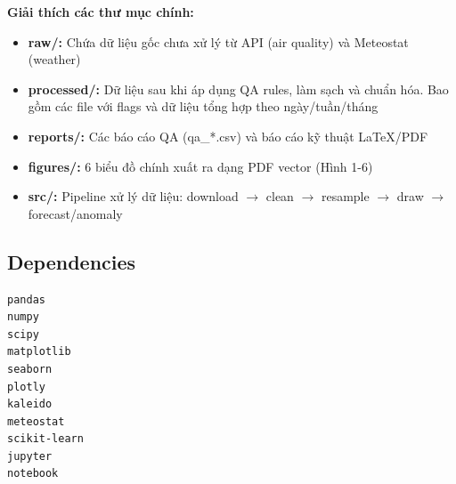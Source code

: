 \documentclass[12pt,a4paper]{article}
\begin{document}
\textbf{Giải thích các thư mục chính:}
\begin{itemize}
    \item \textbf{raw/:} Chứa dữ liệu gốc chưa xử lý từ API (air quality) và Meteostat (weather)
    \item \textbf{processed/:} Dữ liệu sau khi áp dụng QA rules, làm sạch và chuẩn hóa. Bao gồm các file với flags và dữ liệu tổng hợp theo ngày/tuần/tháng
    \item \textbf{reports/:} Các báo cáo QA (qa\_*.csv) và báo cáo kỹ thuật LaTeX/PDF
    \item \textbf{figures/:} 6 biểu đồ chính xuất ra dạng PDF vector (Hình 1-6)
    \item \textbf{src/:} Pipeline xử lý dữ liệu: download $\rightarrow$ clean $\rightarrow$ resample $\rightarrow$ draw $\rightarrow$ forecast/anomaly
\end{itemize}

\subsection{Dependencies}

\begin{lstlisting}[language=bash, caption=requirements.txt]
pandas
numpy
scipy
matplotlib
seaborn
plotly
kaleido
meteostat
scikit-learn
jupyter
notebook
\end{lstlisting}
\end{document}
